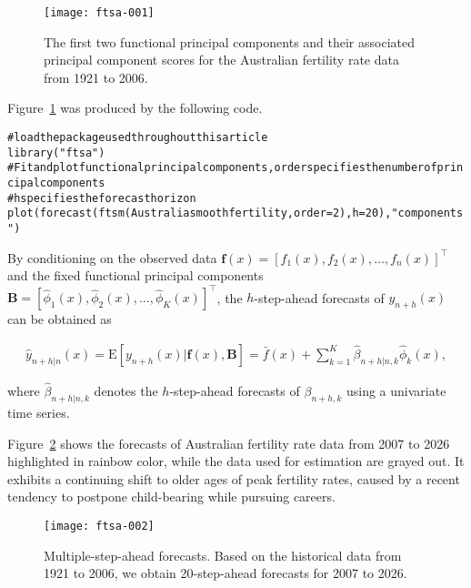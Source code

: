 \documentclass[nojss]{jss}
\newenvironment{smallexample}{\begin{alltt}\small}{\end{alltt}}
\newenvironment{smallverbatim}{\small\verbatim}{\endverbatim}
\begin{document}
\begin{figure}[!ht]
\centering
\texttt{[image: ftsa-001]}
\caption{The first two functional principal components and their associated principal component scores for the Australian fertility rate data from 1921 to 2006.}\label{fig:3}
\end{figure}

Figure~\ref{fig:3} was produced by the following code.
\begin{smallexample}
\begin{smallverbatim}
# load the package used throughout this article
library("ftsa")
# Fit and plot functional principal components, order specifies the number of principal components
# h specifies the forecast horizon
plot(forecast(ftsm(Australiasmoothfertility, order=2), h = 20), "components")
\end{smallverbatim}
\end{smallexample}

By conditioning on the observed data $\bm{f}(x)=[f_1(x),f_2(x),\dots,f_n(x)]^{\top}$ and the fixed functional principal components $\mathcal{\bm{B}}=[\widehat{\phi}_1(x),\widehat{\phi}_2(x),\dots,\widehat{\phi}_K(x)]^{\top}$, the $h$-step-ahead forecasts of $y_{n+h}(x)$ can be obtained as
\begin{small}
\begin{align*}
\widehat{y}_{n+h|n}(x)=\text{E}[y_{n+h}(x)|\bm{f}(x),\mathcal{\bm{B}}]=\bar{f}(x)+\sum^K_{k=1}\widehat{\beta}_{n+h|n,k}\widehat{\phi}_k(x),
\end{align*}
\end{small}
where $\widehat{\beta}_{n+h|n,k}$ denotes the $h$-step-ahead forecasts of $\beta_{n+h,k}$ using a univariate time series.

Figure~\ref{fig:4} shows the forecasts of Australian fertility rate data from 2007 to 2026 highlighted in rainbow color, while the data used for estimation are grayed out. It exhibits a continuing shift to older ages of peak fertility rates, caused by a recent tendency to postpone child-bearing while pursuing careers.


\begin{figure}[!ht]
  \begin{center}
\texttt{[image: ftsa-002]}
\end{center}
\caption{Multiple-step-ahead forecasts. Based on the historical data from 1921 to 2006, we obtain 20-step-ahead forecasts for 2007 to 2026.}\label{fig:4}
\end{figure}
\end{document}

